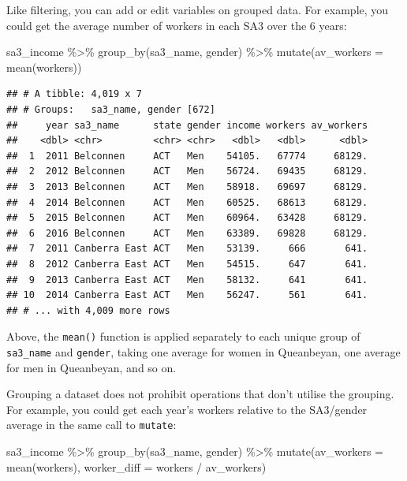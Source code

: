 \documentclass[
]{book}
\newenvironment{Shaded}{\begin{snugshade}}{\end{snugshade}}
\newcommand{\AttributeTok}[1]{\textcolor[rgb]{0.77,0.63,0.00}{#1}}
\newcommand{\FunctionTok}[1]{\textcolor[rgb]{0.00,0.00,0.00}{#1}}
\newcommand{\NormalTok}[1]{#1}
\newcommand{\SpecialCharTok}[1]{\textcolor[rgb]{0.00,0.00,0.00}{#1}}
\begin{document}
Like filtering, you can add or edit variables on grouped data. For example, you could get the average number of workers in each SA3 over the 6 years:

\begin{Shaded}
\begin{Highlighting}[]
\NormalTok{sa3\_income }\SpecialCharTok{\%\textgreater{}\%} 
  \FunctionTok{group\_by}\NormalTok{(sa3\_name, gender) }\SpecialCharTok{\%\textgreater{}\%} 
  \FunctionTok{mutate}\NormalTok{(}\AttributeTok{av\_workers =} \FunctionTok{mean}\NormalTok{(workers))}
\end{Highlighting}
\end{Shaded}

\begin{verbatim}
## # A tibble: 4,019 x 7
## # Groups:   sa3_name, gender [672]
##     year sa3_name      state gender income workers av_workers
##    <dbl> <chr>         <chr> <chr>   <dbl>   <dbl>      <dbl>
##  1  2011 Belconnen     ACT   Men    54105.   67774     68129.
##  2  2012 Belconnen     ACT   Men    56724.   69435     68129.
##  3  2013 Belconnen     ACT   Men    58918.   69697     68129.
##  4  2014 Belconnen     ACT   Men    60525.   68613     68129.
##  5  2015 Belconnen     ACT   Men    60964.   63428     68129.
##  6  2016 Belconnen     ACT   Men    63389.   69828     68129.
##  7  2011 Canberra East ACT   Men    53139.     666       641.
##  8  2012 Canberra East ACT   Men    54515.     647       641.
##  9  2013 Canberra East ACT   Men    58132.     641       641.
## 10  2014 Canberra East ACT   Men    56247.     561       641.
## # ... with 4,009 more rows
\end{verbatim}

Above, the \texttt{mean()} function is applied separately to each unique group of \texttt{sa3\_name} and \texttt{gender}, taking one average for women in Queanbeyan, one average for men in Queanbeyan, and so on.

Grouping a dataset does not prohibit operations that don't utilise the grouping. For example, you could get each year's workers relative to the SA3/gender average in the same call to \texttt{mutate}:

\begin{Shaded}
\begin{Highlighting}[]
\NormalTok{sa3\_income }\SpecialCharTok{\%\textgreater{}\%} 
  \FunctionTok{group\_by}\NormalTok{(sa3\_name, gender) }\SpecialCharTok{\%\textgreater{}\%} 
  \FunctionTok{mutate}\NormalTok{(}\AttributeTok{av\_workers =} \FunctionTok{mean}\NormalTok{(workers),}
         \AttributeTok{worker\_diff =}\NormalTok{ workers }\SpecialCharTok{/}\NormalTok{ av\_workers)}
\end{Highlighting}
\end{Shaded}
\end{document}

